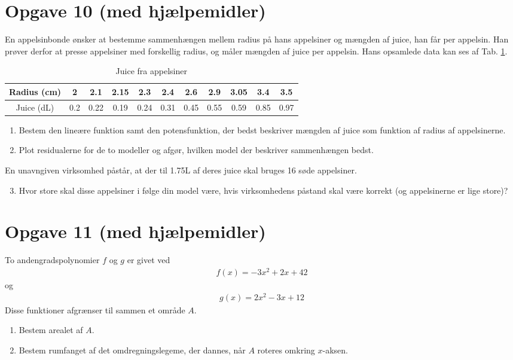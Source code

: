 \section*{Opgave 10 (med hjælpemidler)}
En appelsinbonde ønsker at bestemme sammenhængen mellem radius på hans appelsiner og mængden af juice, han får per appelsin. Han prøver derfor at presse appelsiner med forskellig radius, og måler mængden af juice per appelsin. Hans opsamlede data kan ses af Tab. \ref{tab:juice}.
\begin{table}[H]
\begin{tabular}{c|c|c|c|c|c|c|c|c|c|c}
Radius (cm) & 2 & 2.1 & 2.15 & 2.3 & 2.4 & 2.6 & 2.9 & 3.05 & 3.4 & 3.5\\ \hline
Juice (dL) & 0.2 & 0.22 & 0.19 &0.24 & 0.31 & 0.45 & 0.55 & 0.59 & 0.85 & 0.97
\end{tabular}
\caption{Juice fra appelsiner}
\label{tab:juice}
\end{table}

\begin{enumerate}[label=\roman*)]
\item Bestem den lineære funktion samt den potensfunktion, der bedst beskriver mængden af juice som funktion af radius af appelsinerne. 
\item Plot residualerne for de to modeller og afgør, hvilken model der beskriver sammenhængen bedst.
\end{enumerate}
En unavngiven virksomhed påstår, at der til 1.75L af deres juice skal bruges 16 søde appelsiner. 

\begin{enumerate}[label=\roman*)]
\setcounter{enumi}{2}
\item Hvor store skal disse appelsiner i følge din model være, hvis virksomhedens påstand skal være korrekt (og appelsinerne er lige store)?
\end{enumerate}

\section*{Opgave 11 (med hjælpemidler)}
To andengradspolynomier $f$ og $g$ er givet ved
\begin{align*}
	f(x) = -3x^2 + 2x + 42
\end{align*}
og 
\begin{align*}
	g(x) = 2x^2 - 3x + 12
\end{align*}
Disse funktioner afgrænser til sammen et område $A$. 
\begin{enumerate}[label=\roman*)]
\item Bestem arealet af $A$.
\item Bestem rumfanget af det omdregningslegeme, der dannes, når $A$ roteres omkring $x$-aksen.
\end{enumerate}


